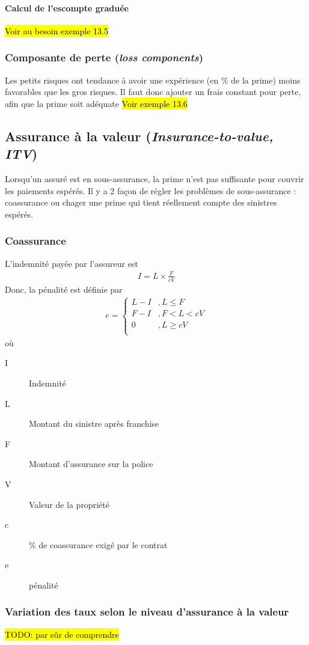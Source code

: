 \paragraph{Calcul de l'escompte graduée} \hl{Voir au besoin exemple 13.5}


\subsubsection{Composante de perte (\textit{loss components})} Les petits risques ont tendance à avoir une expérience (en \% de la prime) moins favorables que les gros risques. Il faut donc ajouter un frais constant pour perte, afin que la prime soit adéquate
\hl{Voir exemple 13.6}

\subsection{Assurance à la valeur (\textit{Insurance-to-value, ITV})} Lorsqu'un assuré est en sous-assurance, la prime n'est pas suffisante pour couvrir les paiements espérés. Il y a 2 façon de régler les problèmes de sous-assurance : coassurance ou chager une prime qui tient réellement compte des sinistres espérés.

\subsubsection{Coassurance}
\begin{multicols*}{2}
L'indemnité payée par l'assureur est
\begin{align*}
I = L \times \frac{F}{cV}
\end{align*}
Donc, la pénalité est définie par
\begin{align*}
e = 
\begin{cases}
L - I	& , L \leq F \\
F - I 	& , F < L < cV \\
0		& , L \geq cV \\
\end{cases}
\end{align*}
\vfill
\columnbreak
où
\begin{description}
\item[I] Indemnité
\item[L] Montant du sinistre après franchise
\item[F] Montant d'assurance sur la police
\item[V] Valeur de la propriété
\item[c] \% de coassurance exigé par le contrat
\item[e] pénalité
\end{description}
\end{multicols*}

\subsubsection{Variation des taux selon le niveau d'assurance à la valeur}
\hl{TODO: par sûr de comprendre}
